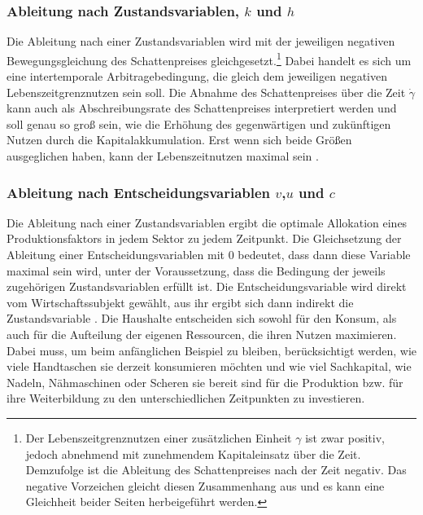 \subsubsection*{Ableitung nach Zustandsvariablen, $k$ und $h$}
Die Ableitung nach einer Zustandsvariablen wird mit der jeweiligen negativen Bewegungsgleichung des Schattenpreises gleichgesetzt.\footnote{Der Lebenszeitgrenznutzen einer zusätzlichen Einheit $\gamma$ ist zwar positiv, jedoch abnehmend mit zunehmendem Kapitaleinsatz über die Zeit. Demzufolge ist die Ableitung des Schattenpreises nach der Zeit negativ. Das negative Vorzeichen gleicht diesen Zusammenhang aus und es kann eine Gleichheit beider Seiten herbeigeführt werden.} Dabei handelt es sich um eine intertemporale Arbitragebedingung, die gleich dem jeweiligen negativen Lebenszeitgrenznutzen sein soll. Die Abnahme des Schattenpreises über die Zeit $\dot{\gamma}$ kann auch als Abschreibungsrate des Schattenpreises interpretiert werden und soll genau so gro{\ss} sein, wie die Erhöhung des gegenwärtigen und zukünftigen Nutzen durch die Kapitalakkumulation. Erst wenn sich beide Grö{\ss}en ausgeglichen haben, kann der Lebenszeitnutzen maximal sein \citep{Chiang.2000,Chiang.2011}.

\subsubsection*{Ableitung nach Entscheidungsvariablen $v$,$u$ und $c$ }
Die Ableitung nach einer Zustandsvariablen ergibt die optimale Allokation eines Produktionsfaktors in jedem Sektor zu jedem Zeitpunkt. Die Gleichsetzung der Ableitung einer Entscheidungsvariablen mit $0$ bedeutet, dass dann diese Variable maximal sein wird, unter der Voraussetzung, dass die Bedingung der jeweils zugehörigen Zustandsvariablen erf{\"u}llt ist.\newline 
Die Entscheidungsvariable wird direkt vom Wirtschaftssubjekt gewählt, aus ihr ergibt sich dann indirekt die Zustandsvariable \citep{Chiang.2011}. Die Haushalte entscheiden sich sowohl für den Konsum, als auch für die Aufteilung der eigenen Ressourcen, die ihren Nutzen maximieren. Dabei muss, um beim anfänglichen Beispiel zu bleiben, berücksichtigt werden, wie viele Handtaschen sie derzeit konsumieren möchten und wie viel Sachkapital, wie Nadeln, Nähmaschinen oder Scheren  sie bereit sind für die Produktion bzw. für ihre Weiterbildung zu den unterschiedlichen Zeitpunkten zu investieren. 

